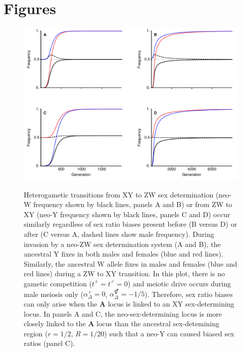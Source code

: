 \documentclass[12pt]{article}
\begin{document}



\newpage
\section*{Figures}
\newpage

\begin{figure}[!h]
\centering
\includegraphics[width=\linewidth]{Combination_Turnover}\\
\caption{
Heterogametic transitions from XY to ZW sex determination (neo-W frequency shown by black lines, panels A and B) or from ZW to XY (neo-Y frequency shown by black lines, panels C and D) occur similarly regardless of sex ratio biases present before (B versus D) or after (C versus A, dashed lines show male frequency). 
During invasion by a neo-ZW sex determination system (A and B), the ancestral Y fixes in both males and females (blue and red lines). 
Similarly, the ancestral W allele fixes in males and females (blue and red lines) during a ZW to XY transition. 
In this plot, there is no gametic competition ($t^\female=t^\male=0$) and meiotic drive occurs during male meiosis only ($\alpha^\female_{\Delta}=0$, $\alpha^\Hermaphrodite_{\Delta}=-1/5$). Therefore, sex ratio biases can only arise when the \textbf{A} locus is linked to an XY sex-determining locus.
In panels A and C, the neo-sex-determining locus is more closely linked to the \textbf{A} locus than the ancestral sex-detemining region ($r=1/2$, $R=1/20$) such that a neo-Y can caused biased sex ratios (panel C).
}
\end{figure}
\end{document}
